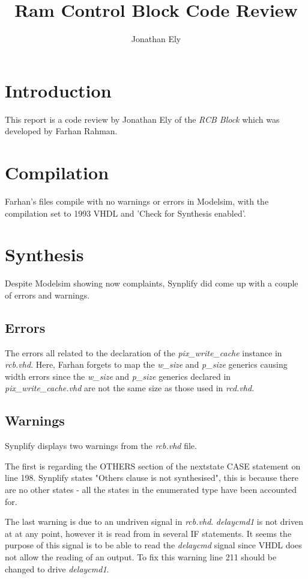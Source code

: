 \documentclass[11pt,a4paper]{article}
\title{Ram Control Block Code Review}
\author{Jonathan Ely}
\begin{document}
\maketitle
\section{Introduction}
This report is a code review by Jonathan Ely of the \emph{RCB Block}
which was developed by Farhan Rahman.

\section{Compilation}
Farhan's files compile with no warnings or errors in Modelsim, with
the compilation set to 1993 VHDL and 'Check for Synthesis enabled'.

\section{Synthesis}
Despite Modelsim showing now complaints, Synplify did come up with a 
couple of errors and warnings. 

\subsection{Errors}
The errors all related to the declaration
of the \emph{pix\_write\_cache} instance in \emph{rcb.vhd}. Here, Farhan
forgets to map the \emph{w\_size} and \emph{p\_size} generics causing width
errors since the \emph{w\_size} and \emph{p\_size} generics declared in 
\emph{pix\_write\_cache.vhd} are not the same size as those used in \emph{rcd.vhd}.

\subsection{Warnings}
Synplify displays two warnings from the \emph{rcb.vhd} file.

The first is regarding the OTHERS section of the nextstate CASE statement on line 198.
Synplify states "Others clause is not synthesised", this is because there
are no other states - all the states in the enumerated type have been accounted for.

The last warning is due to an undriven signal in \emph{rcb.vhd}. \emph{delaycmd1}
is not driven at at any point, however it is read from in several IF statements. 
It seems the purpose of this signal is to be able to read the \emph{delaycmd} signal
since VHDL does not allow the reading of an output. To fix this warning line 211 
should be changed to drive \emph{delaycmd1}.
\end{document}
